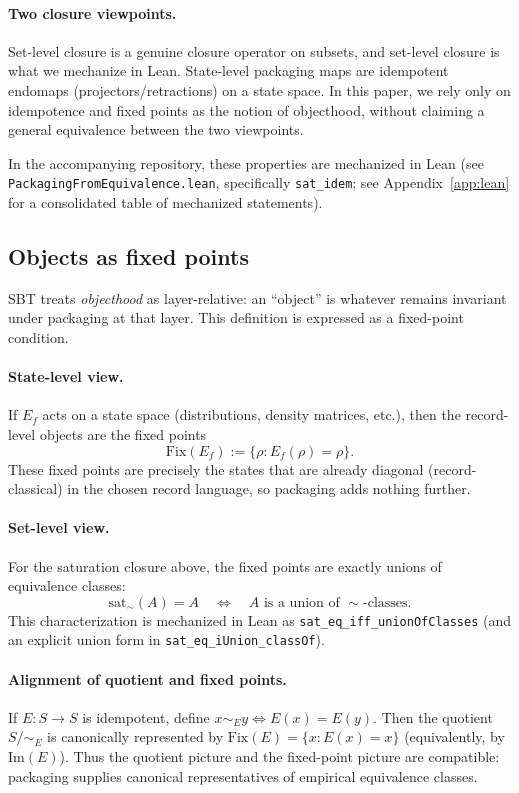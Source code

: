 \paragraph{Two closure viewpoints.}
Set-level closure is a genuine closure operator on subsets, and set-level closure is what we mechanize in Lean. State-level packaging maps are idempotent endomaps (projectors/retractions) on a state space. In this paper, we rely only on idempotence and fixed points as the notion of objecthood, without claiming a general equivalence between the two viewpoints.

In the accompanying repository, these properties are mechanized in Lean (see \texttt{Packaging\-From\-Equivalence.lean}, specifically \texttt{sat\_idem}; see Appendix~\ref{app:lean} for a consolidated table of mechanized statements).

\subsection{Objects as fixed points}

SBT treats \emph{objecthood} as layer-relative: an ``object'' is whatever remains invariant under packaging at that layer.
This definition is expressed as a fixed-point condition.

\paragraph{State-level view.}
If $E_f$ acts on a state space (distributions, density matrices, etc.), then the record-level objects are the fixed points
\[
\mathrm{Fix}(E_f) := \{\rho : E_f(\rho)=\rho\}.
\]
These fixed points are precisely the states that are already diagonal (record-classical) in the chosen record language, so packaging adds nothing further.

\paragraph{Set-level view.}
For the saturation closure above, the fixed points are exactly unions of equivalence classes:
\[
\mathrm{sat}_\sim(A)=A \quad\Longleftrightarrow\quad
\text{$A$ is a union of $\sim$-classes.}
\]
This characterization is mechanized in Lean as \texttt{sat\_eq\_iff\_unionOfClasses} (and an explicit union form in \texttt{sat\_eq\_iUnion\_classOf}).

\paragraph{Alignment of quotient and fixed points.}
If $E:S\to S$ is idempotent, define $x\sim_E y \iff E(x)=E(y)$. Then the quotient $S/{\sim_E}$ is canonically represented by $\mathrm{Fix}(E)=\{x:E(x)=x\}$ (equivalently, by $\mathrm{Im}(E)$). Thus the quotient picture and the fixed-point picture are compatible: packaging supplies canonical representatives of empirical equivalence classes.

